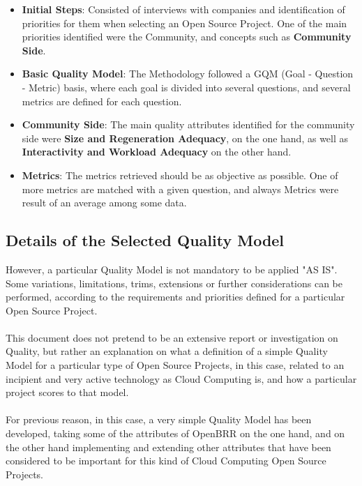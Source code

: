 \documentclass[11pt]{article}
\begin{document}
\begin{itemize}
\begin{itemize}
\begin{itemize}\itemsep0pt
\item{\textbf{Initial Steps}}: Consisted of interviews with companies and identification of priorities for them when selecting an Open Source Project. One of the main priorities identified were the Community, and concepts such as \textbf{Community Side}.
\item{\textbf{Basic Quality Model}}: The Methodology followed a GQM (Goal - Question - Metric) basis, where each goal  is divided into several questions, and several metrics are defined for each question.
\item{\textbf{Community Side}}: The main quality attributes identified for the community side were \textbf{Size and Regeneration Adequacy}, on the one hand, as well as \textbf{Interactivity and Workload Adequacy} on the other hand. 
\item{\textbf{Metrics}}: The metrics retrieved should be as objective as possible. One of more metrics are matched with a given question, and always Metrics were result of an average among some data. 
\end{itemize}

\end{itemize}
\end{itemize}

\subsection{Details of the Selected Quality Model}\label{sec:quality_model}
However, a particular Quality Model is not mandatory to be applied "AS IS". Some variations, limitations, trims, extensions or further considerations can be performed, according to the requirements and priorities defined for a particular Open Source Project.\\
\\
This document does not pretend to be an extensive report or investigation on Quality, but rather an explanation on what a definition of a simple Quality Model for a particular type of Open Source Projects, in this case, related to an incipient and very active technology as Cloud Computing is, and how a particular project scores to that model.\\
\\
For previous reason, in this case, a very simple Quality Model has been developed, taking some of the attributes of OpenBRR on the one hand, and on the other hand implementing and extending other attributes that have been considered to be important for this kind of Cloud Computing Open Source Projects.
\end{document}
